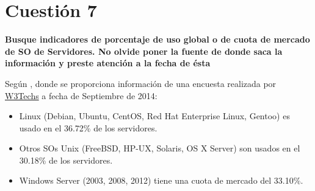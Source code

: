 \documentclass[a4paper,11pt]{article}
\newenvironment{answer}{%
\begin{list}{}{%
\addtolength{\hoffset}{0cm}
}%
\item[]}{\end{list}}
\begin{document}
\section{Cuestión 7}
\textbf{Busque indicadores de porcentaje de uso global o de cuota de mercado de SO de Servidores. No olvide poner 
la fuente de donde saca la información y preste atención a la fecha de ésta}
\begin{answer}
  
Según \cite{quota}, donde se proporciona información de una encuesta realizada por \href{http://w3techs.com/}{W3Techs} a fecha de Septiembre de 2014:
\begin{itemize}
  \item Linux (Debian, Ubuntu, CentOS, Red Hat Enterprise Linux, Gentoo) es usado en el 36.72\% de los servidores.
  \item Otros SOs Unix (FreeBSD, HP-UX, Solaris, OS X Server) son usados en el 30.18\% de los servidores.
  \item Windows Server (2003, 2008, 2012) tiene una cuota de mercado del 33.10\%.
\end{itemize}
\end{answer}
\end{document}
